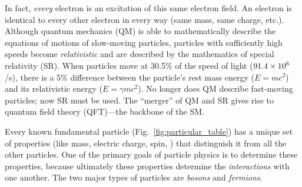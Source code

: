 In fact, \emph{every} electron is an excitation of this same electron field. 
An electron is identical to every other electron in every way (same mass, same charge, etc.).
Although quantum mechanics (QM) is able to mathematically describe the equations of motions of slow-moving particles, particles with sufficiently high speeds become \emph{relativistic} and are described by the mathematics of special relativity (SR).
When particles move at 30.5\% of the speed of light ($91.4 \times \text{10}^\text{6}$\meter/s), there is a 5\% difference between the particle's rest mass energy ($E = mc^2$) and its relativistic energy ($E = \gamma mc^2$).
No longer does QM describe fast-moving particles; now SR must be used.
The ``merger'' of QM and SR gives rise to quantum field theory (QFT)---the backbone of the SM.

Every known fundamental particle (Fig.~\ref{fig:particular_table}) has a unique set of properties (like mass, electric charge, spin, \etc) that distinguish it from all the other particles. 
One of the primary goals of particle physics is to determine these properties, because ultimately these properties determine the  \emph{interactions} with one another. 
The two major types of particles are \emph{bosons} and \emph{fermions}.


